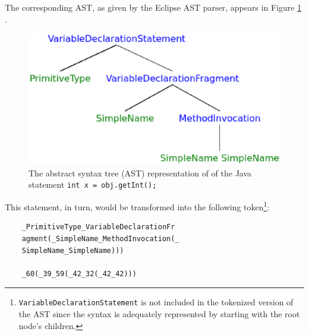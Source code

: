\documentclass{article}
\begin{document}
The corresponding AST, as given by the Eclipse AST parser, appears in Figure \ref{ast-figure} \cite{Eclipse}.

\begin{figure}[ht]
\vskip 0.2in
\begin{center}
\centerline{\includegraphics[width=\columnwidth]{ast.eps}}
\caption{The abstract syntax tree (AST) representation of of the Java statement
\texttt{int x = obj.getInt();}}
\label{ast-figure}
\end{center}
\vskip -0.2in
\end{figure} 

This statement, in turn, would be transformed into the following token\footnote{
\texttt{VariableDeclarationStatement} is not included in the
tokenized version of the AST since the syntax is adequately represented
by starting with the root node's children.}:


\begin{verbatim}
    _PrimitiveType_VariableDeclarationFr
    agment(_SimpleName_MethodInvocation(_
    SimpleName_SimpleName)))

    _60(_39_59(_42_32(_42_42)))
\end{verbatim}
\end{document}
